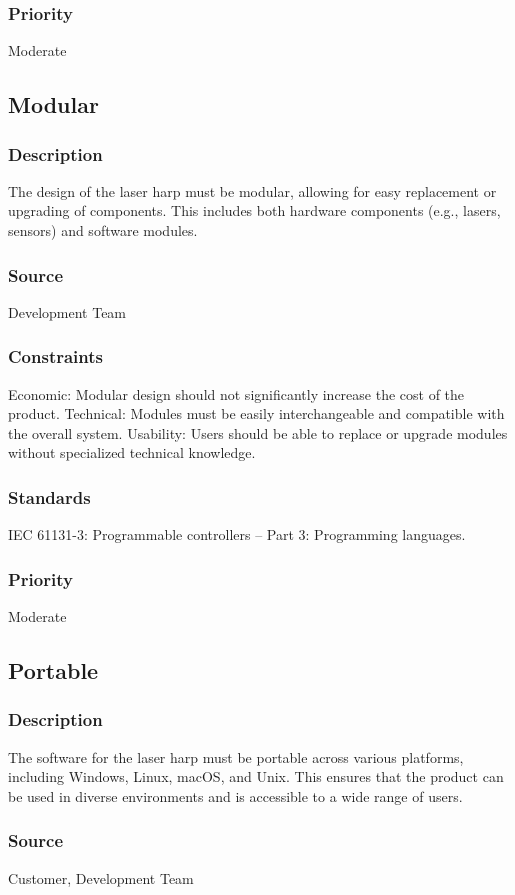 \subsubsection{Priority}
Moderate


\subsection{Modular}
\subsubsection{Description}
The design of the laser harp must be modular, allowing for easy replacement or upgrading of components. This includes both hardware components (e.g., lasers, sensors) and software modules.
\subsubsection{Source}
Development Team
\subsubsection{Constraints}
Economic: Modular design should not significantly increase the cost of the product.
Technical: Modules must be easily interchangeable and compatible with the overall system.
Usability: Users should be able to replace or upgrade modules without specialized technical knowledge.
\subsubsection{Standards}
IEC 61131-3: Programmable controllers – Part 3: Programming languages.
\subsubsection{Priority}
Moderate


\subsection{Portable}
\subsubsection{Description}
The software for the laser harp must be portable across various platforms, including Windows, Linux, macOS, and Unix. This ensures that the product can be used in diverse environments and is accessible to a wide range of users.
\subsubsection{Source}
Customer, Development Team
